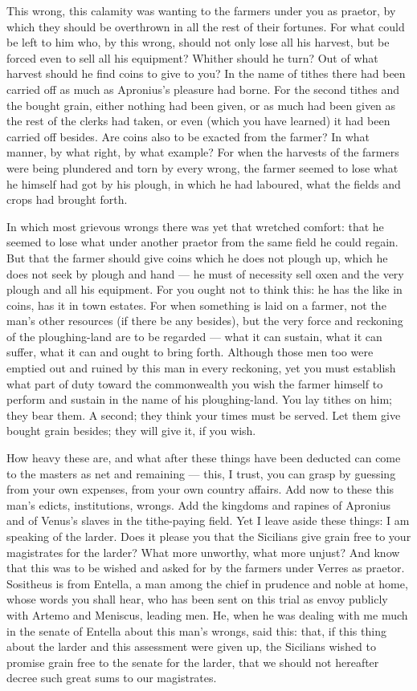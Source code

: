  This wrong, this calamity was wanting to the farmers under you as praetor, by which they should be overthrown in all the rest of their fortunes. For what could be left to him who, by this wrong, should not only lose all his harvest, but be forced even to sell all his equipment? Whither should he turn? Out of what harvest should he find coins to give to you? In the name of tithes there had been carried off as much as Apronius's pleasure had borne. For the second tithes and the bought grain, either nothing had been given, or as much had been given as the rest of the clerks had taken, or even (which you have learned) it had been carried off besides. Are coins also to be exacted from the farmer? In what manner, by what right, by what example? For when the harvests of the farmers were being plundered and torn by every wrong, the farmer seemed to lose what he himself had got by his plough, in which he had laboured, what the fields and crops had brought forth.

 In which most grievous wrongs there was yet that wretched comfort: that he seemed to lose what under another praetor from the same field he could regain. But that the farmer should give coins which he does not plough up, which he does not seek by plough and hand --- he must of necessity sell oxen and the very plough and all his equipment. For you ought not to think this: he has the like in coins, has it in town estates. For when something is laid on a farmer, not the man's other resources (if there be any besides), but the very force and reckoning of the ploughing-land are to be regarded --- what it can sustain, what it can suffer, what it can and ought to bring forth. Although those men too were emptied out and ruined by this man in every reckoning, yet you must establish what part of duty toward the commonwealth you wish the farmer himself to perform and sustain in the name of his ploughing-land. You lay tithes on him; they bear them. A second; they think your times must be served. Let them give bought grain besides; they will give it, if you wish.

 How heavy these are, and what after these things have been deducted can come to the masters as net and remaining --- this, I trust, you can grasp by guessing from your own expenses, from your own country affairs. Add now to these this man's edicts, institutions, wrongs. Add the kingdoms and rapines of Apronius and of Venus's slaves in the tithe-paying field. Yet I leave aside these things: I am speaking of the larder. Does it please you that the Sicilians give grain free to your magistrates for the larder? What more unworthy, what more unjust? And know that this was to be wished and asked for by the farmers under Verres as praetor. Sositheus is from Entella, a man among the chief in prudence and noble at home, whose words you shall hear, who has been sent on this trial as envoy publicly with Artemo and Meniscus, leading men. He, when he was dealing with me much in the senate of Entella about this man's wrongs, said this: that, if this thing about the larder and this assessment were given up, the Sicilians wished to promise grain free to the senate for the larder, that we should not hereafter decree such great sums to our magistrates.

